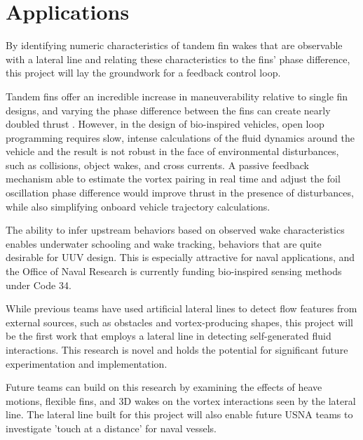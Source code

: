 \section{Applications}
    
    By identifying numeric characteristics of tandem fin wakes that are observable with a lateral line and relating these characteristics to the fins' phase difference, this project will lay the groundwork for a feedback control loop. 
    
    Tandem fins offer an incredible increase in maneuverability relative to single fin designs, and varying the phase difference between the fins can create nearly doubled thrust \citep{Gopalkrishnan1994, Muscutt2017}. However, in the design of bio-inspired vehicles, open loop programming requires slow, intense calculations of the fluid dynamics around the vehicle and the result is not robust in the face of environmental disturbances, such as collisions, object wakes, and cross currents. A passive feedback mechanism able to estimate the vortex pairing in real time and adjust the foil oscillation phase difference would improve thrust in the presence of disturbances, while also simplifying onboard vehicle trajectory calculations.
    
    The ability to infer upstream behaviors based on observed wake characteristics enables underwater schooling and wake tracking, behaviors that are quite desirable for UUV design. This is especially attractive for naval applications, and the Office of Naval Research is currently funding bio-inspired sensing methods under Code 34.
    
    While previous teams have used artificial lateral lines to detect flow features from external sources, such as obstacles and vortex-producing shapes, this project will be the first work that employs a lateral line in detecting self-generated fluid interactions. This research is novel and holds the potential for significant future experimentation and implementation.
    
    Future teams can build on this research by examining the effects of heave motions, flexible fins, and 3D wakes on the vortex interactions seen by the lateral line. The lateral line built for this project will also enable future USNA teams to investigate 'touch at a distance' for naval vessels.